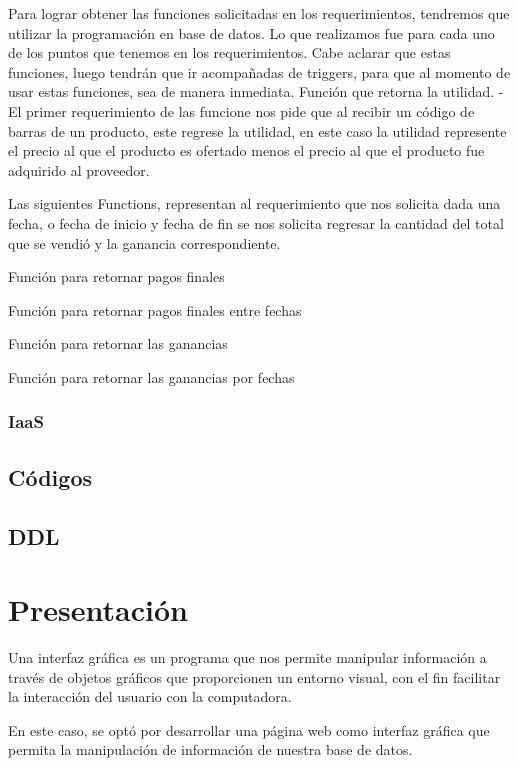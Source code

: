 \documentclass[12pt,letterpaper]{article}
\begin{document}
		
		Para lograr obtener las funciones solicitadas en los requerimientos, tendremos que utilizar la programación en base de datos. Lo que realizamos fue para cada uno de los puntos que tenemos en los requerimientos. Cabe aclarar que estas funciones, luego tendrán que ir acompañadas de triggers, para que al momento de usar estas funciones, sea de manera inmediata.
		Función que retorna la utilidad.
		- El primer requerimiento de las funcione nos pide que al recibir un código de barras de un producto, este regrese la utilidad, en este caso la utilidad represente el precio al que el producto es ofertado menos el precio al que el producto fue adquirido al proveedor.
		
		
		Las siguientes Functions, representan al requerimiento que nos solicita dada una fecha, o fecha de inicio y fecha de fin se nos solicita regresar la cantidad del total que se vendió y la ganancia correspondiente.
		
		Función para retornar pagos finales
		
		
		Función para retornar pagos finales entre fechas
		
		
		Función para retornar las ganancias
		
		
		Función para retornar las ganancias por fechas
		
		
		
		
			\subsubsection{IaaS}
	
		\subsection{Códigos}
		
		\subsection{DDL}
	
	\section{Presentación}
		Una interfaz gráfica es un programa que nos permite manipular información a través de objetos gráficos que proporcionen un entorno visual, con el fin facilitar la interacción del usuario con la computadora.\par
		En este caso, se optó por desarrollar una página web como interfaz gráfica que permita la manipulación de información de nuestra base de datos.
		
\end{document}
